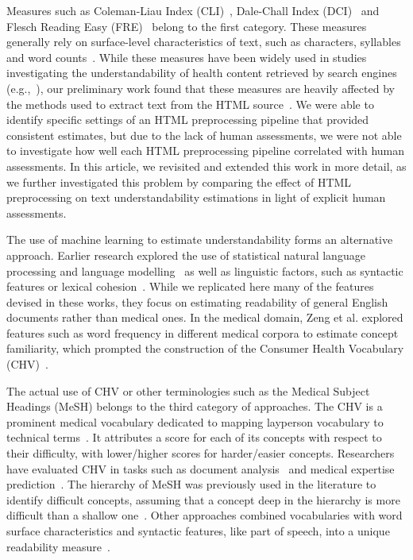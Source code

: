 \documentclass[10pt,a4paper]{article}
\begin{document}
Measures such as Coleman-Liau Index (CLI)~\cite{cli75}, Dale-Chall Index (DCI)~\cite{dale48} and Flesch Reading Easy (FRE)~\cite{flesch75}
belong to the first category. These measures generally rely on surface-level characteristics of text, such as characters, syllables and word counts~\cite{dubay04}. While these measures have been widely used in studies investigating the understandability of health content retrieved by search engines (e.g.,~\cite{becker04,graber99,fitzsimmons10,stossel12,wiener13,patel13,meillier17}), 
our preliminary work found that these measures are heavily affected by the methods used to extract text from the HTML source~\cite{palotti15}. We were able to identify specific settings of an HTML preprocessing pipeline that provided consistent estimates, but due to the lack of human assessments, we were not able to investigate how well each HTML preprocessing pipeline correlated with human assessments.
In this article, we revisited and extended this work in more detail, as we further investigated this problem by comparing the effect of HTML preprocessing on text understandability estimations in light of explicit human assessments. 

The use of machine learning to estimate understandability forms an alternative approach. Earlier research explored the use of statistical natural language processing and language modelling~\cite{liu04,collins05,heilman07} as well as linguistic factors, such as syntactic features or lexical cohesion~\cite{pitler08}. While we replicated here many of the features devised in these works, they focus on estimating readability of general English documents rather than medical ones. In the medical domain, Zeng et al. explored features such as word frequency in different medical corpora to estimate concept familiarity, which prompted the construction of the Consumer Health Vocabulary (CHV)~\cite{zeng05,zeng06,zeng08}.  

The actual use of CHV or other terminologies such as the Medical Subject Headings (MeSH) belongs to the third category of approaches. The CHV is a prominent medical vocabulary dedicated to mapping layperson vocabulary to technical terms~\cite{zeng06}. It attributes a score for each of its concepts with respect to their difficulty, with lower/higher scores for harder/easier concepts. Researchers have evaluated CHV in tasks such as document analysis~\cite{leroy08} and medical expertise prediction~\cite{palotti14}.
The hierarchy of MeSH was previously used in the literature to identify difficult concepts, assuming that a concept deep in the hierarchy is more difficult than a shallow one~\cite{yan11}. Other approaches combined vocabularies with word surface characteristics and syntactic features, like part of speech, into a unique readability measure~\cite{kim2007beyond}.
\end{document}
